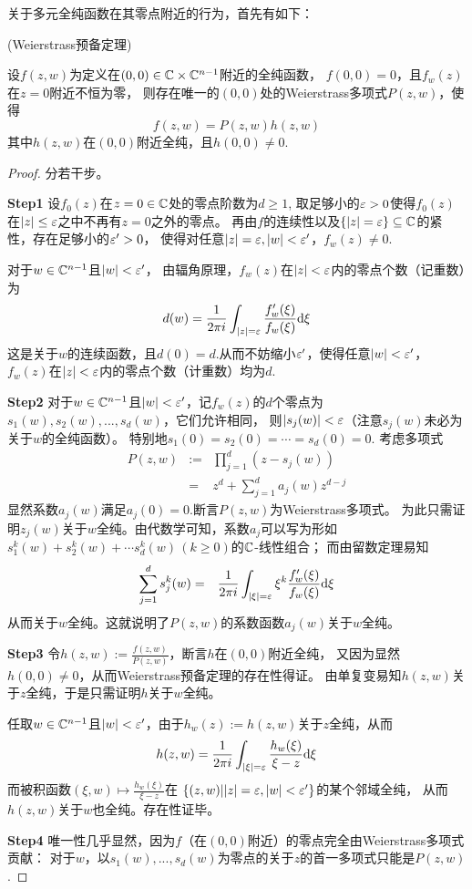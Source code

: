关于多元全纯函数在其零点附近的行为，首先有如下：

\begin{thm}(Weierstrass预备定理)

设$f(z,w)$为定义在$(0,0)\in\mathbb{C}\times\mathbb{C}^{n-1}$附近的全纯函数，
$f(0,0)=0$，且$f_w(z)$在$z=0$附近不恒为零，
则存在唯一的$(0,0)$处的Weierstrass多项式$P(z,w)$，使得
$$f(z,w)=P(z,w)h(z,w)$$
其中$h(z,w)$在$(0,0)$附近全纯，且$h(0,0)\neq 0$.
\end{thm}

\begin{proof}分若干步。

\textbf{Step1}
设$f_0(z)$在$z=0\in\mathbb{C}$处的零点阶数为$d\geq 1$,
取足够小的$\varepsilon>0$使得$f_0(z)$在$|z|\leq\varepsilon$之中不再有$z=0$之外的零点。
再由$f$的连续性以及$\{|z|=\varepsilon\}\subseteq\mathbb{C}$的紧性，存在足够小的$\varepsilon'>0$，
使得对任意$|z|=\varepsilon,|w|<\varepsilon'$，$f_w(z)\neq 0$.

对于$w\in\mathbb{C}^{n-1}$且$|w|<\varepsilon'$，
由辐角原理，$f_w(z)$在$|z|<\varepsilon$内的零点个数（记重数）为
$$
  d(w)=
       \frac{1}{2\pi i}
       \int_{|z|=\varepsilon}
         \frac{f_w'(\xi)}{f_w(\xi)}
         \mathrm{d}\xi
$$
这是关于$w$的连续函数，且$d(0)=d$.从而不妨缩小$\varepsilon'$，使得任意$|w|<\varepsilon'$，
$f_w(z)$在$|z|<\varepsilon$内的零点个数（计重数）均为$d$.

\textbf{Step2}
对于$w\in\mathbb{C}^{n-1}$且$|w|<\varepsilon'$，记$f_w(z)$的$d$个零点为
$s_1(w),s_2(w),...,s_d(w)$，它们允许相同，
则$|s_j(w)|<\varepsilon$（注意$s_j(w)$未必为关于$w$的全纯函数）。
特别地$s_1(0)=s_2(0)=\cdots=s_d(0)=0$.
考虑多项式
\begin{eqnarray*}
  P(z,w)&:=&\prod_{j=1}^d(z-s_j(w))\\
         &=&z^d+\sum_{j=1}^da_j(w)z^{d-j}
\end{eqnarray*}
显然系数$a_j(w)$满足$a_j(0)=0$.断言$P(z,w)$为Weierstrass多项式。
为此只需证明$z_j(w)$关于$w$全纯。由代数学可知，系数$a_j$可以写为形如
$s_1^k(w)+s_2^k(w)+\cdots s_d^k(w)\,(k\geq 0)$的$\mathbb{C}$-线性组合；
而由留数定理易知
\begin{eqnarray*}
     \sum_{j=1}^ds_j^k(w)
&=&
     \frac{1}{2\pi i}
       \int_{|\xi|=\varepsilon}
         \xi^k
         \frac{f_w'(\xi)}{f_w(\xi)}
         \mathrm{d}\xi
\end{eqnarray*}
从而关于$w$全纯。这就说明了$P(z,w)$的系数函数$a_j(w)$关于$w$全纯。

\textbf{Step3}
令$h(z,w):=\frac{f(z,w)}{P(z,w)}$，断言$h$在$(0,0)$附近全纯，
又因为显然$h(0,0)\neq 0$，从而Weierstrass预备定理的存在性得证。
由单复变易知$h(z,w)$关于$z$全纯，于是只需证明$h$关于$w$全纯。

任取$w\in\mathbb{C}^{n-1}$且$|w|<\varepsilon'$，由于$h_w(z):=h(z,w)$关于$z$全纯，从而
$$
  h(z,w)
=
  \frac{1}{2\pi i}
  \int_{|\xi|=\varepsilon}
    \frac{h_w(\xi)}{\xi-z}
    \mathrm{d}\xi
$$
而被积函数$(\xi,w)\mapsto\frac{h_w(\xi)}{\xi-z}$在
$\{(z,w)||z|=\varepsilon,|w|<\varepsilon'\}$的某个邻域全纯，
从而$h(z,w)$关于$w$也全纯。存在性证毕。

\textbf{Step4}
唯一性几乎显然，因为$f$（在$(0,0)$附近）的零点完全由Weierstrass多项式贡献：
对于$w$，以$s_1(w),...,s_d(w)$为零点的关于$z$的首一多项式只能是$P(z,w)$.
\end{proof}

